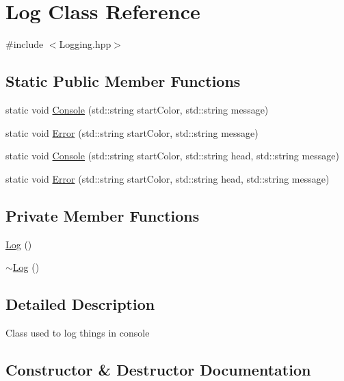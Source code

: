 \hypertarget{classLog}{}\section{Log Class Reference}
\label{classLog}


{\ttfamily \#include $<$Logging.\+hpp$>$}

\subsection*{Static Public Member Functions}
\begin{DoxyCompactItemize}
\item 
static void \mbox{\hyperlink{classLog_ab03809956a91617a2a8debef16111824}{Console}} (std\+::string start\+Color, std\+::string message)
\item 
static void \mbox{\hyperlink{classLog_a0bb208257d7c4d2ef60a53ef6b4c1932}{Error}} (std\+::string start\+Color, std\+::string message)
\item 
static void \mbox{\hyperlink{classLog_a17f7b098fc056675e98a900f85c9c9ae}{Console}} (std\+::string start\+Color, std\+::string head, std\+::string message)
\item 
static void \mbox{\hyperlink{classLog_a32af45ac98fd45728edcab2c3405b3f7}{Error}} (std\+::string start\+Color, std\+::string head, std\+::string message)
\end{DoxyCompactItemize}
\subsection*{Private Member Functions}
\begin{DoxyCompactItemize}
\item 
\mbox{\hyperlink{classLog_af6071a60aa52b6c1b511f99b4bc1b8fe}{Log}} ()
\item 
\mbox{\hyperlink{classLog_a0fbfda88fbee5027c89f6eb121059360}{$\sim$\+Log}} ()
\end{DoxyCompactItemize}


\subsection{Detailed Description}
Class used to log things in console 

\subsection{Constructor \& Destructor Documentation}
\mbox{\label{classLog_af6071a60aa52b6c1b511f99b4bc1b8fe}} 
